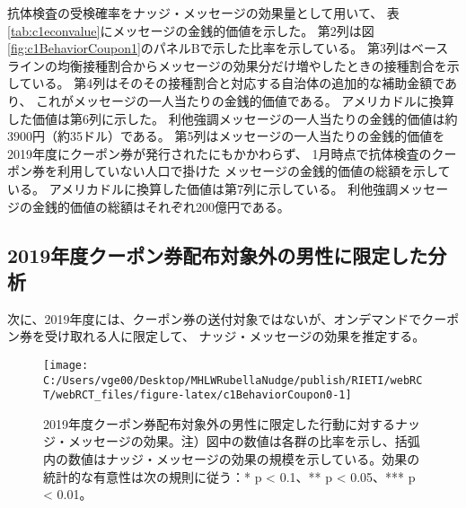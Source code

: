 \documentclass[
  11pt,
  a4paper,
]{article}
\begin{document}
抗体検査の受検確率をナッジ・メッセージの効果量として用いて、
表\ref{tab:c1econvalue}にメッセージの金銭的価値を示した。
第2列は図\ref{fig:c1BehaviorCoupon1}のパネルBで示した比率を示している。
第3列はベースラインの均衡接種割合からメッセージの効果分だけ増やしたときの接種割合を示している。
第4列はそのその接種割合と対応する自治体の追加的な補助金額であり、
これがメッセージの一人当たりの金銭的価値である。
アメリカドルに換算した価値は第6列に示した。
利他強調メッセージの一人当たりの金銭的価値は約3900円（約35ドル）である。
第5列はメッセージの一人当たりの金銭的価値を
2019年度にクーポン券が発行されたにもかかわらず、
1月時点で抗体検査のクーポン券を利用していない人口で掛けた
メッセージの金銭的価値の総額を示している。
アメリカドルに換算した価値は第7列に示している。
利他強調メッセージの金銭的価値の総額はそれぞれ200億円である。

\hypertarget{ux5e74ux5ea6ux30afux30fcux30ddux30f3ux5238ux914dux5e03ux5bfeux8c61ux5916ux306eux7537ux6027ux306bux9650ux5b9aux3057ux305fux5206ux6790}{%
\subsection{2019年度クーポン券配布対象外の男性に限定した分析}\label{ux5e74ux5ea6ux30afux30fcux30ddux30f3ux5238ux914dux5e03ux5bfeux8c61ux5916ux306eux7537ux6027ux306bux9650ux5b9aux3057ux305fux5206ux6790}}

次に、2019年度には、クーポン券の送付対象ではないが、オンデマンドでクーポン券を受け取れる人に限定して、
ナッジ・メッセージの効果を推定する。

\begin{figure}[t]
\texttt{[image: C:/Users/vge00/Desktop/MHLWRubellaNudge/publish/RIETI/webRCT/webRCT\_files/figure-latex/c1BehaviorCoupon0-1]} \caption{2019年度クーポン券配布対象外の男性に限定した行動に対するナッジ・メッセージの効果。注）図中の数値は各群の比率を示し、括弧内の数値はナッジ・メッセージの効果の規模を示している。効果の統計的な有意性は次の規則に従う：* p < 0.1、** p < 0.05、*** p < 0.01。}\label{fig:c1BehaviorCoupon0}
\end{figure}
\end{document}
